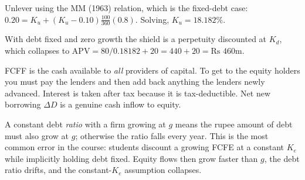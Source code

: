 \documentclass[11pt,a4paper]{article}
\begin{document}
\begin{soln}
Unlever using the MM (1963) relation, which is the fixed-debt case:
$0.20 = K_u + (K_u-0.10)\tfrac{100}{360}(0.8)$. Solving, $K_u = \mathbf{18.182\%}$.\par
With debt fixed and zero growth the shield is a perpetuity discounted at $K_d$, which
collapses to
$\text{APV} = 80/0.18182 + 20 = 440 + 20 = \text{Rs }460$m.
\end{soln}

\begin{soln}
FCFF is the cash available to \emph{all} providers of capital. To get to the equity
holders you must pay the lenders and then add back anything the lenders newly advanced.
Interest is taken after tax because it is tax-deductible. Net new borrowing $\Delta D$
is a genuine cash inflow to equity.
\end{soln}

\begin{soln}
A constant debt \emph{ratio} with a firm growing at $g$ means the rupee amount of debt
must also grow at $g$; otherwise the ratio falls every year.
This is the most common error in the course: students discount a growing FCFE at a
constant $K_e$ while implicitly holding debt fixed. Equity flows then grow faster than
$g$, the debt ratio drifts, and the constant-$K_e$ assumption collapses.
\end{soln}
\end{document}
